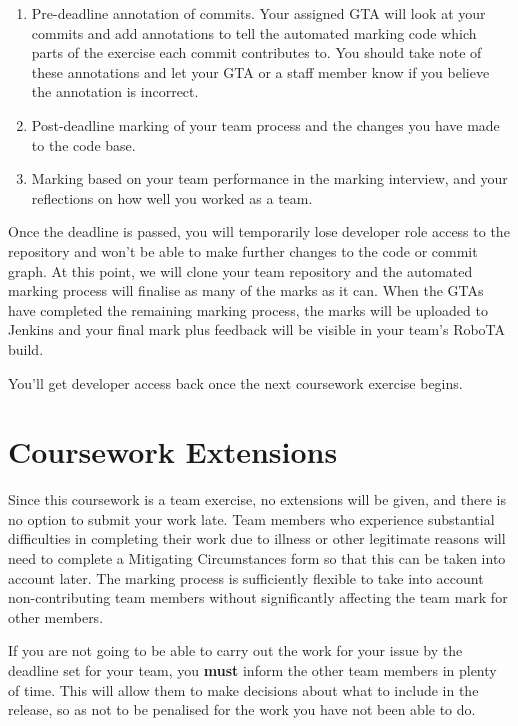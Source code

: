 \documentclass[
]{book}
\providecommand{\tightlist}{%
  \setlength{\itemsep}{0pt}\setlength{\parskip}{0pt}}
\begin{document}
\begin{enumerate}
\def\labelenumi{\arabic{enumi}.}
\tightlist
\item
  Pre-deadline annotation of commits. Your assigned GTA will look at your commits and add annotations to tell the automated marking code which parts of the exercise each commit contributes to. You should take note of these annotations and let your GTA or a staff member know if you believe the annotation is incorrect.
\item
  Post-deadline marking of your team process and the changes you have made to the code base.
\item
  Marking based on your team performance in the marking interview, and your reflections on how well you worked as a team.
\end{enumerate}

Once the deadline is passed, you will temporarily lose developer role access to the repository and won't be able to make further changes to the code or commit graph. At this point, we will clone your team repository and the automated marking process will finalise as many of the marks as it can. When the GTAs have completed the remaining marking process, the marks will be uploaded to Jenkins and your final mark plus feedback will be visible in your team's RoboTA build.

You'll get developer access back once the next coursework exercise begins.

\hypertarget{cwkex}{%
\section{Coursework Extensions}\label{cwkex}}

Since this coursework is a team exercise, no extensions will be given, and there is no option to submit your work late. Team members who experience substantial difficulties in completing their work due to illness or other legitimate reasons will need to complete a Mitigating Circumstances form so that this can be taken into account later. The marking process is sufficiently flexible to take into account non-contributing team members without significantly affecting the team mark for other members.

If you are not going to be able to carry out the work for your issue by the deadline set for your team, you \textbf{must} inform the other team members in plenty of time. This will allow them to make decisions about what to include in the release, so as not to be penalised for the work you have not been able to do.
\end{document}
